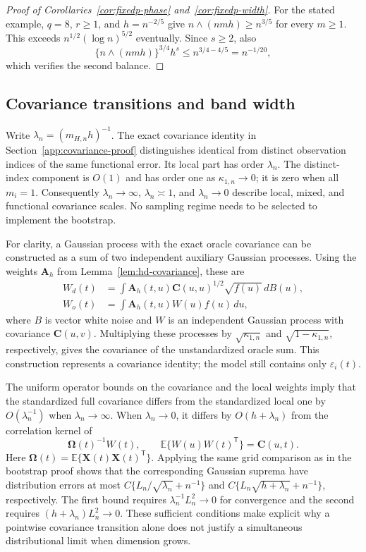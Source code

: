 \documentclass[10pt]{book}
\newcommand{\bA}{{\mathbf A}}
\newcommand{\bC}{{\mathbf C}}
\newcommand{\bX}{{\mathbf X}}
\newcommand{\bOmega} {\boldsymbol{\Omega}}
\newcommand{\expect}{\mathbb{E}}
\newcommand{\trans}{{\scriptscriptstyle\mathsf{T}}}
\numberwithin{equation}{section}
\begin{document}
\begin{proof}[Proof of Corollaries~\ref{cor:fixedp-phase} and~\ref{cor:fixedp-width}]
For the stated example, $q=8$, $r\ge1$, and $h=n^{-2/5}$ give
$n\wedge(nmh)\ge n^{3/5}$ for every $m\ge1$. This exceeds
$n^{1/2}(\log n)^{5/2}$ eventually. Since $s\ge2$, also
\[
\{n\wedge(nmh)\}^{3/4}h^s
\le n^{3/4-4/5}=n^{-1/20},
\]
which verifies the second balance.
\end{proof}

\subsection{Covariance transitions and band width}
\label{app:proof-phase-components}

Write $\lambda_n=(m_{H,n}h)^{-1}$. The exact covariance identity in
Section~\ref{app:covariance-proof} distinguishes identical from distinct
observation indices of the same functional error. Its local part has
order $\lambda_n$. The distinct-index component is $O(1)$ and has
order one as $\kappa_{1,n}\to0$; it is zero when all $m_i=1$. Consequently
$\lambda_n\to\infty$, $\lambda_n\asymp1$, and $\lambda_n\to0$
describe local, mixed, and functional covariance scales. No sampling regime
needs to be selected to implement the bootstrap.

For clarity, a Gaussian process with the exact oracle covariance can be
constructed as a sum of two independent auxiliary Gaussian processes.
Using the weights $\bA_h$ from Lemma~\ref{lem:hd-covariance}, these are
\[
\begin{aligned}
W_d(t)&=\int\bA_h(t,u)\bC(u,u)^{1/2}\sqrt{f(u)}\,dB(u),\\
W_o(t)&=\int\bA_h(t,u)W(u)f(u)\,du,
\end{aligned}
\]
where $B$ is vector white noise and $W$ is an independent Gaussian
process with covariance $\bC(u,v)$.
Multiplying these processes by $\sqrt{\kappa_{1,n}}$ and
$\sqrt{1-\kappa_{1,n}}$, respectively, gives the covariance of the
unstandardized oracle sum. This construction represents a covariance
identity; the model still contains only $\varepsilon_i(t)$.

The uniform operator bounds on the covariance and the local weights imply
that the standardized full covariance differs from the standardized local
one by $O(\lambda_n^{-1})$ when $\lambda_n\to\infty$.
When $\lambda_n\to0$, it differs by $O(h+\lambda_n)$ from the correlation
kernel of
\[
\bOmega(t)^{-1}W(t),\qquad
\expect\{W(u)W(t)^\trans\}=\bC(u,t).
\]
Here $\bOmega(t)=\expect\{\bX(t)\bX(t)^\trans\}$.
Applying the same grid comparison as in the bootstrap proof shows that
the corresponding Gaussian suprema have distribution errors at most
$C\{L_n/\sqrt{\lambda_n}+n^{-1}\}$ and
$C\{L_n\sqrt{h+\lambda_n}+n^{-1}\}$, respectively.
The first bound requires $\lambda_n^{-1}L_n^2\to0$ for convergence and
the second requires $(h+\lambda_n)L_n^2\to0$.
These sufficient conditions make explicit why a pointwise covariance
transition alone does not justify a simultaneous distributional limit
when dimension grows.
\end{document}
